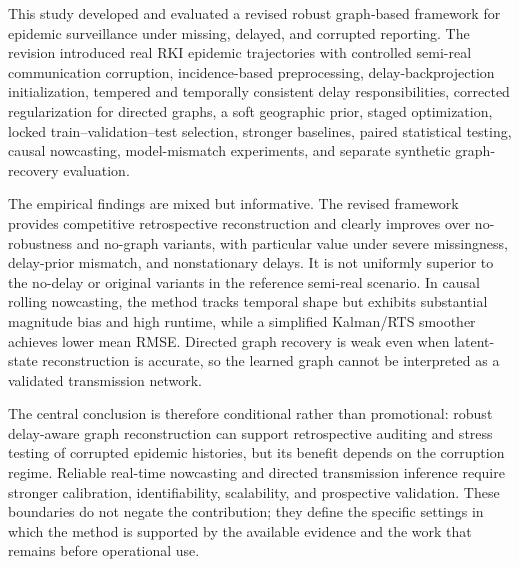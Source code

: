 This study developed and evaluated a revised robust graph-based framework for epidemic surveillance under missing, delayed, and corrupted reporting. The revision introduced real RKI epidemic trajectories with controlled semi-real communication corruption, incidence-based preprocessing, delay-backprojection initialization, tempered and temporally consistent delay responsibilities, corrected regularization for directed graphs, a soft geographic prior, staged optimization, locked train--validation--test selection, stronger baselines, paired statistical testing, causal nowcasting, model-mismatch experiments, and separate synthetic graph-recovery evaluation.

The empirical findings are mixed but informative. The revised framework provides competitive retrospective reconstruction and clearly improves over no-robustness and no-graph variants, with particular value under severe missingness, delay-prior mismatch, and nonstationary delays. It is not uniformly superior to the no-delay or original variants in the reference semi-real scenario. In causal rolling nowcasting, the method tracks temporal shape but exhibits substantial magnitude bias and high runtime, while a simplified Kalman/RTS smoother achieves lower mean RMSE. Directed graph recovery is weak even when latent-state reconstruction is accurate, so the learned graph cannot be interpreted as a validated transmission network.

The central conclusion is therefore conditional rather than promotional: robust delay-aware graph reconstruction can support retrospective auditing and stress testing of corrupted epidemic histories, but its benefit depends on the corruption regime. Reliable real-time nowcasting and directed transmission inference require stronger calibration, identifiability, scalability, and prospective validation. These boundaries do not negate the contribution; they define the specific settings in which the method is supported by the available evidence and the work that remains before operational use.
